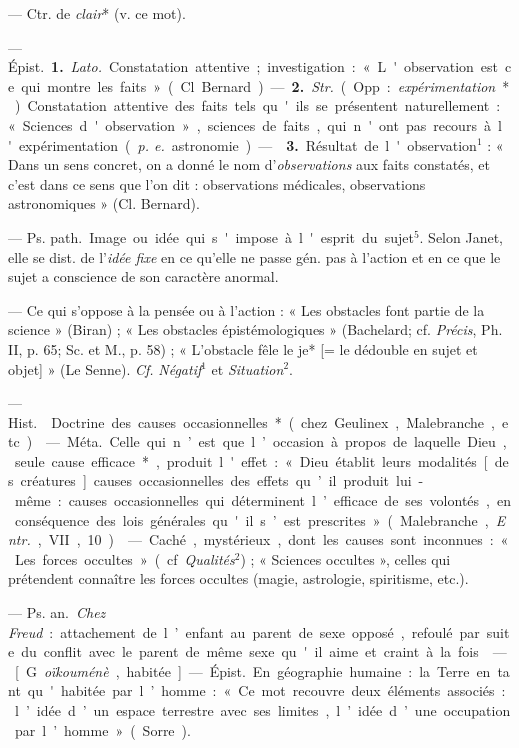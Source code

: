 \begin{itemize}[leftmargin=1cm, label=, itemsep=1pt]
 — Ctr. de {\it clair}* (v. ce mot).

 —  \si{Épist.} {\bf 1.} {\it Lato.}
Constatation attentive; investigation : « L'observation est ce qui montre les
faits » (Cl. Bernard). — {\bf 2.} {\it Str.} (Opp. : {\it expérimentation}*).
Constatation attentive des faits tels qu'ils se présentent naturellement :
« Sciences d'observation », sciences de faits, qui n'ont pas recours à
l'expérimentation ({\it p. e.} astronomie). —  {\bf 3.}
Résultat de l'observation$^1$ : « Dans un sens concret, on a donné le nom
d'{\it observations} aux faits constatés, et c’est dans ce sens que l’on dit :
observations médicales, observations astronomiques » (Cl. Bernard).

 — \si{Ps. path.} Image ou idée qui s'impose à l'esprit du
sujet$^5$. Selon Janet, elle se dist. de l’{\it idée fixe} en ce qu’elle ne
passe gén. pas à l’action et en ce que le sujet a conscience de son caractère
anormal.

 — Ce qui s'oppose à la pensée ou à l’action : « Les obstacles
font partie de la science » (Biran) ; « Les obstacles épistémologiques
» (Bachelard; cf. {\it Précis}, Ph. II, p. 65; Sc. et M., p. 58) ;
« L’obstacle fêle le je* [= le dédouble en sujet et objet] » (Le Senne).
{\it Cf.} {\it Négatif}$^1$ et {\it Situation}$^2$.

 — \si{Hist.}  Doctrine des causes
occasionnelles* (chez Geulinex, Malebranche, etc.).

 — \si{Méta.} Celle qui n’est que l’occasion à
propos de laquelle Dieu, seule cause efficace*, produit l'effet : « Dieu
établit leurs modalités [des créatures] causes occasionnelles des effets
qu’il produit lui-même : causes occasionnelles qui déterminent l’efficace de
ses volontés, en conséquence des lois générales qu'il s’est
prescrites » (Malebranche, {\it Entr.}, VII, 10).

 — Caché, mystérieux, dont les causes sont inconnues : « Les
forces occultes » (cf. {\it Qualités}$^2$) ; « Sciences occultes », celles
qui prétendent connaître les forces occultes (magie, astrologie, spiritisme,
etc.).

 — \si{Ps. an.} {\it Chez Freud} : attachement de
l’enfant au parent de sexe opposé, refoulé par suite du conflit avec le
parent de même sexe qu'il aime et craint à la fois.

 — [G. {\it oïkouménè}, habitée] — \si{Épist.} En géographie
humaine : la Terre en tant qu'habitée par l’homme : « Ce mot recouvre deux
éléments associés : l’idée d’un espace terrestre avec ses limites, l’idée
d’une occupation par l’homme » (Sorre).


\end{itemize}
